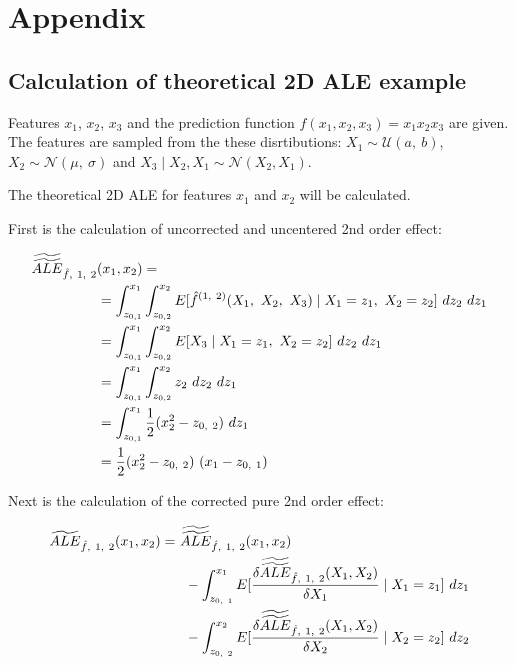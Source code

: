 \documentclass[]{krantz}
\begin{document}
\section{Appendix}\label{appendix}

\subsection{Calculation of theoretical 2D ALE
example}\label{ale-2d-example-calculation}

Features \(x_1\), \(x_2\), \(x_3\) and the prediction function
\(\hat{f}(x_1, x_2, x_3) = x_1 x_2 x_3\) are given. The features are
sampled from the these disrtibutions: \(X_1 \sim \mathcal{U}(a,~b)\),
\(X_2 \sim \mathcal{N}(\mu,~\sigma)\) and
\(X_3\mid X_2, X_1 \sim \mathcal{N}(X_2,X_1)\).

The theoretical 2D ALE for features \(x_1\) and \(x_2\) will be
calculated.

First is the calculation of uncorrected and uncentered 2nd order effect:

\begin{align} 
\widetilde{\widetilde{ALE}}_{\hat{f},~1,~2}&(x_1, x_2) = \notag \\
&= \int_{z_{0,1}}^{x_1}  \int_{z_{0,2}}^{x_2} E[\hat{f}^{(1,~2)}(X_1,~X_2,~X_3)\mid X_1 = z_1,~X_2 = z_2]~dz_2~dz_1 \notag \\
&= \int_{z_{0,1}}^{x_1}  \int_{z_{0,2}}^{x_2} E[X_3 \mid X_1 = z_1,~X_2 = z_2]~dz_2~dz_1 \notag \\
&= \int_{z_{0,1}}^{x_1}  \int_{z_{0,2}}^{x_2} z_2 ~dz_2~dz_1 \notag \\
&= \int_{z_{0,1}}^{x_1}  \frac{1}{2} (x_2^2 - z_{0,~2}) ~dz_1 \notag \\
&= \frac{1}{2} (x_2^2 - z_{0,~2})~(x_1 - z_{0,~1}) 
\end{align}

Next is the calculation of the corrected pure 2nd order effect:

\begin{align}
\widetilde{ALE}_{\hat{f},~1,~2}(x_1, x_2) = ~
&\widetilde{\widetilde{ALE}}_{\hat{f},~1,~2}(x_1, x_2) \notag \\
& ~ -  \int_{z_{0,~1}}^{x_1}  E[\frac{\delta\widetilde{\widetilde{ALE}}_{\hat{f},~1,~2}(X_1, X_2)}{\delta X_1}\mid X_1 = z_1]~dz_1 \notag \\
& ~ - \int_{z_{0,~2}}^{x_2}  E[\frac{\delta\widetilde{\widetilde{ALE}}_{\hat{f},~1,~2}(X_1, X_2)}{\delta X_2}\mid X_2 = z_2]~dz_2
\label{eq:ale2DExampleCorrection}
\end{align}
\end{document}
